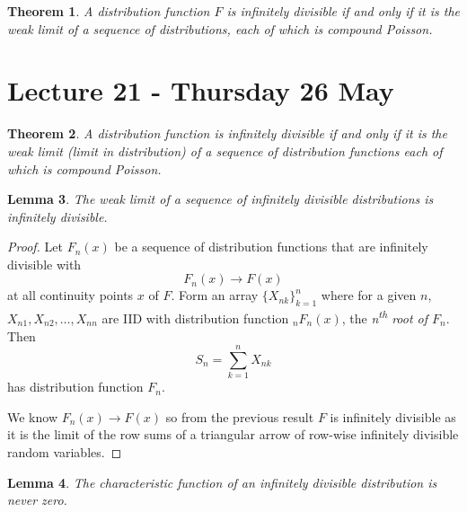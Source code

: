 \documentclass[10pt, oneside, reqno]{amsart}
\theoremstyle{plain}%
\newtheorem{thm}{Theorem}[section]
\newtheorem{lem}[thm]{Lemma}
\theoremstyle{definition}
\theoremstyle{remark}
\begin{document}
\begin{thm}
    A distribution function $F$ is infinitely divisible if and only if it is the weak limit of a sequence of distributions, each of which is compound Poisson.
\end{thm}

\section{Lecture 21 - Thursday 26 May} %
\label{sec:lecture_21_thursday_26_may}
\begin{thm}
    A distribution function is infinitely divisible if and only if it is the weak limit (limit in distribution) of a sequence of distribution functions each of which is compound Poisson.
\end{thm}

\begin{lem}
    \label{lem:infd1}
    The weak limit of a sequence of infinitely divisible distributions is infinitely divisible.
\end{lem}

\begin{proof}
    Let $F_n(x)$ be a sequence of distribution functions that are infinitely divisible with \[
        F_n(x) \rightarrow F(x)
    \] at all continuity points $x$ of $F$.  Form an array $\{ X_{nk} \}_{k=1}^n$ where for a given $n$, $X_{n1}, X_{n2}, \dots, X_{nn}$ are IID with distribution function $_nF_n(x)$, the \emph{n\textsuperscript{th} root of $F_n$}.  Then \[
        S_n = \sum_{k=1}^n X_{nk}
    \]   has distribution function $F_n$.

    We know $F_n(x) \rightarrow F(x)$ so from the previous result $F$ is infinitely divisible as it is the limit of the row sums of a triangular arrow of row-wise infinitely divisible random variables. 
\end{proof}

\begin{lem}
    \label{lem:infd2}
    The characteristic function of an infinitely divisible distribution is never zero.
\end{lem}
\end{document}

